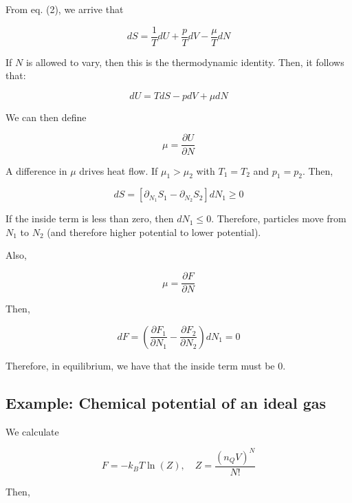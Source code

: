 \documentclass{article}
\newtheorem{one minute paper}[theorem]{One Minute Paper}
\begin{document}
From eq. (2), we arrive that 

\begin{equation}
    dS = \frac{1}{T}dU + \frac{p}{T}dV - \frac{\mu}{T}dN
\end{equation}

If $N$ is allowed to vary, then this is the thermodynamic identity. Then, it follows that:

\begin{equation}
    dU = TdS - pdV + \mu dN
\end{equation}

We can then define 

\begin{equation}
    \mu = \frac{\partial U}{\partial N}
\end{equation}

A difference in $\mu$ drives heat flow. If $\mu_1 > \mu_2$ with $T_1 = T_2$ and $p_1 = p_2$. Then, 

\begin{equation}
    dS = \left[ \partial_{N_1}S_1 - \partial_{N_2}S_2 \right]dN_1 \geq 0
\end{equation}

If the inside term is less than zero, then $dN_1 \leq 0$. Therefore, particles move from $N_1$ to $N_2$ (and therefore higher potential to lower potential). 

Also,

\begin{equation}
    \mu = \frac{\partial F}{\partial N}
\end{equation}

Then, 

\begin{equation}
    dF = \left( \frac{\partial F_1}{\partial N_1} - \frac{\partial F_2}{\partial N_2} \right)dN_1 = 0
\end{equation}

Therefore, in equilibrium, we have that the inside term must be 0. 

\subsection*{Example: Chemical potential of an ideal gas}

We calculate 

\begin{equation}
    F = -k_B T\ln(Z), \quad Z = \frac{(n_Q V)^N}{N!}
\end{equation}

Then, 
\end{document}

